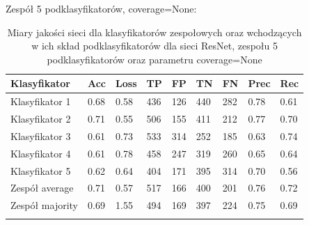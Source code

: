 \documentclass[polish,12pt]{aghthesis}
\begin{document}
\vspace{3mm}
\noindent Zespół 5 podklasyfikatorów, coverage=None:
 \begin{longtable}[h!]{|m{2.6cm}|m{1.2cm}|m{1.2cm}|m{1.2cm}|m{1.2cm}|m{1.2cm}|m{1.2cm}|m{1.2cm}|m{1.2cm}|}
 \hline
 Klasyfikator & Acc & Loss & TP & FP & TN & FN & Prec & Rec\\
 \hline
 Klasyfikator 1 & 0.68 & 0.58 & 436 & 126 & 440 & 282 & 0.78 & 0.61\\
 \hline
 Klasyfikator 2 & 0.71 & 0.55 & 506 & 155 & 411 & 212 & 0.77 & 0.70\\
 \hline
 Klasyfikator 3 & 0.61 & 0.73 & 533 & 314 & 252 & 185 & 0.63 & 0.74\\
 \hline
 Klasyfikator 4 & 0.61 & 0.78 & 458 & 247 & 319 & 260 & 0.65 & 0.64\\
 \hline
 Klasyfikator 5 & 0.62 & 0.64 & 404 & 171 & 395 & 314 & 0.70 & 0.56\\
 \hline
 Zespół average & 0.71 & 0.57 & 517 & 166 & 400 & 201 & 0.76 & 0.72\\ 
 \hline
 Zespół \newline majority & 0.69 & 1.55 & 494 & 169 & 397 & 224 & 0.75 & 0.69\\
 \hline
\caption{Miary jakości sieci dla klasyfikatorów zespołowych oraz wchodzących w ich skład podklasyfikatorów dla sieci ResNet, zespołu 5 podklasyfikatorów oraz parametru coverage=None}
\label{table:20}
\end{longtable}
\end{document}
